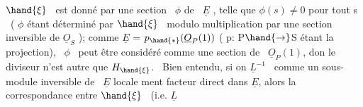  \quad $\hand{\xi}$ \ est donné par une section \ $\phi$ de \ $\underline{E}$ ,  telle
 que $\phi(s) \neq 0$ pour tout s \ ( $\phi$ étant déterminé par $\hand{\xi}$ \ modulo
multiplication par une section inversible de $\underline{O}_S$ ); comme $\underline{E}$ = $p_{\hand{*}}(\underline{O}_P(1))$
( p: P$\hand{\to}$S étant la projection), \ $\phi$ \ peut être considéré comme une section
de \ $\underline{O}_P(1)$, don le diviseur n'est autre que $H_{\hand{\xi}}$. \ Bien entendu, si on
 $\underline{L}^{-1}$ \ comme un sous- module inversible de \ $\underline{E}$ locale
ment facteur direct dans $\underline{E}$, alors la correspondance entre $\hand{\xi}$ \ (i.e. $\underline{L}$ \hand{\unsure{$\xi$,}}

